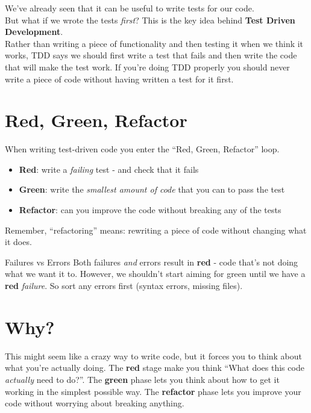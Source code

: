 We've already seen that it can be useful to write tests for our code.
\\

But what if we wrote the tests \textit{first}? This is the key idea behind \textbf{Test Driven Development}.
\\

Rather than writing a piece of functionality and then testing it when we think it works, TDD says we should first write a test that fails and then write the code that will make the test work. If you're doing TDD properly you should never write a piece of code without having written a test for it first.

\section{Red, Green, Refactor}

When writing test-driven code you enter the ``Red, Green, Refactor'' loop.

\begin{itemize}
    \item \textbf{Red}: write a \textit{failing} test - and check that it fails
    \item \textbf{Green}: write the \textit{smallest amount of code} that you can to pass the test
    \item \textbf{Refactor}: can you improve the code without breaking any of the tests
\end{itemize}

Remember, ``refactoring'' means: rewriting a piece of code without changing what it does.

\begin{infobox}{Failures vs Errors}
    Both failures \textit{and} errors result in \textbf{red} - code that's not doing what we want it to. However, we shouldn't start aiming for green until we have a \textbf{red} \textit{failure}. So sort any errors first (syntax errors, missing files).
\end{infobox}


\section{Why?}

This might seem like a crazy way to write code, but it forces you to think about what you're actually doing. The \textbf{red} stage make you think ``What does this code \textit{actually} need to do?''. The \textbf{green} phase lets you think about how to get it working in the simplest possible way. The \textbf{refactor} phase lets you improve your code without worrying about breaking anything.
\\

